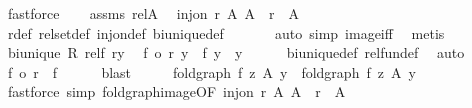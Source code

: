 \begin{isabellebody}
\ fastforce\isanewline
\ \ \isamarkupfalse%
\ assms\ rel{\isacharunderscore}{\kern0pt}A\ \isamarkupfalse%
\ {\isachardoublequoteopen}inj{\isacharunderscore}{\kern0pt}on\ r\ A{}{\isachardoublequoteclose}\ {\isachardoublequoteopen}A{}\ {\isacharequal}{\kern0pt}\ r\ {\isacharbackquote}{\kern0pt}\ A{}{\isachardoublequoteclose}\isanewline
\ \ \ \ \isamarkupfalse%
\ r{\isacharunderscore}{\kern0pt}def\ rel{\isacharunderscore}{\kern0pt}set{\isacharunderscore}{\kern0pt}def\ inj{\isacharunderscore}{\kern0pt}on{\isacharunderscore}{\kern0pt}def\ bi{\isacharunderscore}{\kern0pt}unique{\isacharunderscore}{\kern0pt}def\isanewline
\ \ \ \ \ \ \isamarkupfalse%
{\isacharparenleft}{\kern0pt}auto\ simp{\isacharcolon}{\kern0pt}\ image{\isacharunderscore}{\kern0pt}iff{\isacharparenright}{\kern0pt}\ \isamarkupfalse%
\ metis{\isacharplus}{\kern0pt}\isanewline
\ \ \isamarkupfalse%
\ {\isacartoucheopen}bi{\isacharunderscore}{\kern0pt}unique\ R{\isacartoucheclose}\ rel{\isacharunderscore}{\kern0pt}f\ r{\isacharunderscore}{\kern0pt}y\ \isamarkupfalse%
\ {\isachardoublequoteopen}{\isacharparenleft}{\kern0pt}f{}\ o\ r{\isacharparenright}{\kern0pt}\ y\ {\isacharequal}{\kern0pt}\ f{}\ y{\isachardoublequoteclose}\ \ y\isanewline
\ \ \ \ \isamarkupfalse%
\ bi{\isacharunderscore}{\kern0pt}unique{\isacharunderscore}{\kern0pt}def\ rel{\isacharunderscore}{\kern0pt}fun{\isacharunderscore}{\kern0pt}def\ \isamarkupfalse%
\ auto\isanewline
\ \ \isamarkupfalse%
\ \isamarkupfalse%
\ {\isachardoublequoteopen}{\isacharparenleft}{\kern0pt}f{}\ o\ r{\isacharparenright}{\kern0pt}\ {\isacharequal}{\kern0pt}\ f{}{\isachardoublequoteclose}\isanewline
\ \ \ \ \isamarkupfalse%
\ blast\isanewline
\ \ \isamarkupfalse%
\ \isamarkupfalse%
\ {\isachardoublequoteopen}fold{\isacharunderscore}{\kern0pt}graph\ f{}\ z{}\ A{}\ y{}\ {\isacharequal}{\kern0pt}\ fold{\isacharunderscore}{\kern0pt}graph\ f{}\ z{}\ A{}\ y{}{\isachardoublequoteclose}\isanewline
\ \ \ \ \isamarkupfalse%
\ {\isacharparenleft}{\kern0pt}fastforce\ simp{\isacharcolon}{\kern0pt}\ fold{\isacharunderscore}{\kern0pt}graph{\isacharunderscore}{\kern0pt}image{\isacharbrackleft}{\kern0pt}OF\ {\isacartoucheopen}inj{\isacharunderscore}{\kern0pt}on\ r\ A{}{\isacartoucheclose}{\isacharbrackright}{\kern0pt}\ {\isacartoucheopen}A{}\ {\isacharequal}{\kern0pt}\ r\ {\isacharbackquote}{\kern0pt}\ A{}{\isacartoucheclose}{\isacharparenright}{\kern0pt}\isanewline

\end{isabellebody}
